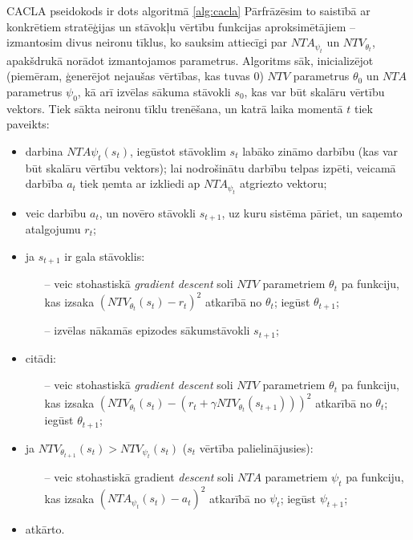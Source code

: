 \documentclass{ludis} %
\begin{document}
\FloatBarrier

CACLA pseidokods ir dots algoritmā \ref{alg:cacla} Pārfrāzēsim to saistībā ar
konkrētiem stratēģijas un stāvokļu vērtību funkcijas aproksimētājiem --
izmantosim divus neironu tīklus, ko sauksim attiecīgi par $NTA_{\psi_t}$ un
$NTV_{\theta_t}$, apakšdrukā norādot izmantojamos parametrus. Algoritms sāk,
inicializējot (piemēram, ģenerējot nejaušas vērtības, kas tuvas $0$) $NTV$
parametrus $\theta_0$ un $NTA$ parametrus $\psi_0$, kā arī izvēlas sākuma
stāvokli $s_0$, kas var būt skalāru vērtību vektors. Tiek sākta neironu tīklu
trenēšana, un katrā laika momentā $t$ tiek paveikts:
\begin{itemize}
	\item darbina $NTA{\psi_t}(s_t)$, iegūstot stāvoklim $s_t$ labāko zināmo
    darbību (kas var būt skalāru vērtību vektors); lai nodrošinātu darbību
    telpas izpēti, veicamā darbība  $a_t$ tiek ņemta ar izkliedi ap
    $NTA_{\psi_t}$ atgriezto vektoru;
	\item veic darbību $a_t$, un novēro stāvokli $s_{t+1}$, uz kuru sistēma
    pāriet, un saņemto atalgojumu $r_t$;
	\item ja $s_{t+1}$ ir gala stāvoklis:
	\begin{itemize}
		\item[--] veic stohastiskā \textit{gradient descent} soli $NTV$ parametriem
      $\theta_t$ pa funkciju, kas izsaka $\left(NTV_{\theta_t}(s_t) -
        r_t\right)^2$ atkarībā no $\theta_t$; iegūst $\theta_{t+1}$;
		\item[--] izvēlas nākamās epizodes sākumstāvokli $s_{t+1}$;
	\end{itemize}
	\item citādi:
	\begin{itemize}
		\item[--] veic stohastiskā \textit{gradient descent} soli $NTV$ parametriem
      $\theta_t$ pa funkciju, kas izsaka ${\left(NTV_{\theta_t}(s_t) - \left(r_t
          + \gamma NTV_{\theta_t}(s_{t+1}) \right) \right)}^2$ atkarībā no
      $\theta_t$; iegūst $\theta_{t+1}$;
	\end{itemize}
	\item ja $NTV_{\theta_{t+1}}(s_t) > NTV_{\psi_t}(s_t)$ ($s_t$ vērtība
    palielinājusies):
	\begin{itemize}
		\item[--] veic stohastiskā gradient \textit{descent} soli $NTA$ parametriem
      $\psi_t$ pa funkciju, kas izsaka ${\left(NTA_{\psi_t}(s_t) - a_t\right)}^2$
      atkarībā no $\psi_t$; iegūst $\psi_{t+1}$;
	\end{itemize}
	\item atkārto.
\end{itemize}
\end{document}
